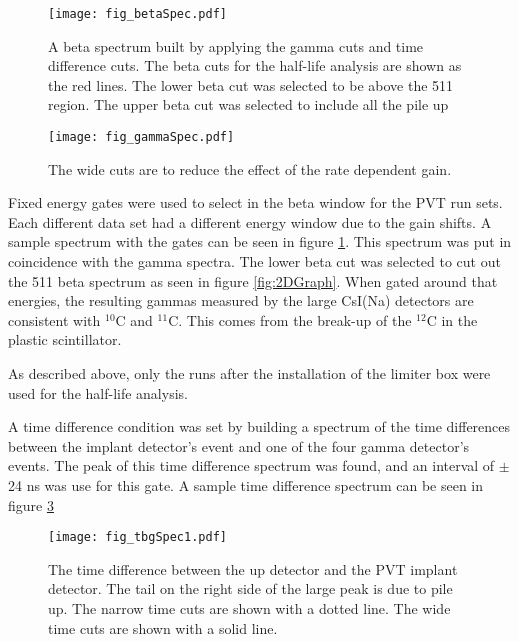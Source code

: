 \documentclass[MaxHughesThesis.tex]{subfiles}
\begin{document}
\begin{figure}[!htb]
	\centerline{\texttt{[image: fig\_betaSpec.pdf]}}
	\caption{
		 A beta spectrum built by applying the gamma cuts and time difference cuts. 
		 The beta cuts for the half-life analysis are shown as the red lines.
		 The lower beta cut was selected to be above the 511 region.
		 The upper beta cut was selected to include all the pile up}
	
	\label{fig:BetaGraph}
\end{figure}

\begin{figure}[!htb]
	\centerline{\texttt{[image: fig\_gammaSpec.pdf]}}
	\caption{The wide cuts are to reduce the effect of the rate dependent gain.}
	\label{fig:GammaGraph}
\end{figure}

Fixed energy gates were used to select in the beta window for the PVT run sets.
Each different data set had a different energy window due to the gain shifts.
A sample spectrum with the gates can be seen in figure \ref{fig:BetaGraph}.
This spectrum was put in coincidence with the gamma spectra. 
The lower beta cut was selected to cut out the 511 beta spectrum as seen in figure \ref{fig:2DGraph}.
When gated around that energies, the resulting gammas measured by the large CsI(Na) detectors are consistent with $^{10}$C and $^{11}$C.
This comes from the break-up of the $^{12}$C in the plastic scintillator. 

As described above, only the runs after the installation of the limiter box were used for the half-life analysis. 

A time difference condition was set by building a spectrum of the time differences between the implant detector's event and one of the four gamma detector's events. 
The peak of this time difference spectrum was found, and an interval of $\pm$24 ns  was use for this gate.
A sample time difference spectrum can be seen in figure \ref{fig:timediff}

\begin{figure}
	\centerline{\texttt{[image: fig\_tbgSpec1.pdf]}}	
	\caption{The time difference between the up detector and the PVT implant detector.
		The tail on the right side of the large peak is due to pile up.
		The narrow time cuts are shown with a dotted line.
		The wide time cuts are shown with a solid line.}
	\label{fig:timediff}
\end{figure}
\end{document}
